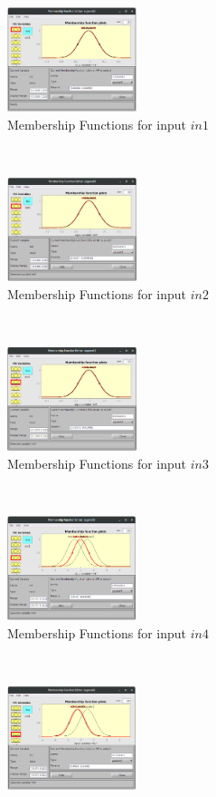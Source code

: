 \documentclass[11pt]{article}
\begin{document}
\begin{figure}[ht]
	\centering
	\begin{subfigure}[t]{0.3\textwidth}
		\centering
		\includegraphics[height=1.2in]{images/fcm_in1}
		\caption{Membership Functions for input $in1$}
	\end{subfigure}
	~ 
	\begin{subfigure}[t]{0.3\textwidth}
		\centering
		\includegraphics[height=1.2in]{images/fcm_in2}
		\caption{Membership Functions for input $in2$}
	\end{subfigure}
	~
	\begin{subfigure}[t]{0.3\textwidth}
		\centering
		\includegraphics[height=1.2in]{images/fcm_in3}
		\caption{Membership Functions for input $in3$}
	\end{subfigure}
	\\
	\begin{subfigure}[t]{0.3\textwidth}
		\centering
		\includegraphics[height=1.2in]{images/fcm_in4}
		\caption{Membership Functions for input $in4$}
	\end{subfigure}
	~ 
	\begin{subfigure}[t]{0.3\textwidth}
		\centering
		\includegraphics[height=1.2in]{images/fcm_in5}

\end{subfigure}
\end{figure}
\end{document}
